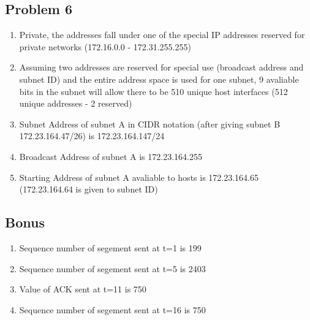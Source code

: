 \documentclass[14pt]{article}
\begin{document}
\pagebreak

\subsection*{Problem 6}
\begin{enumerate}
\item Private, the addresses fall under one of the special IP addresses reserved for private networks (172.16.0.0 - 172.31.255.255)
\item Assuming two addresses are reserved for special use (broadcast address and subnet ID) and the entire address space is used for one subnet, 9 avaliable bits in the subnet will allow there to be 510 unique host interfaces (512 unique addresses - 2 reserved)
\item Subnet Address of subnet A in CIDR notation (after giving subnet B 172.23.164.47/26) is 172.23.164.147/24
\item Broadcast Address of subnet A is 172.23.164.255
\item Starting Address of subnet A avaliable to hosts is 172.23.164.65 (172.23.164.64 is given to subnet ID)
\end{enumerate}

\subsection*{Bonus}
\begin{enumerate}
\item Sequence number of segement sent at t=1 is 199
\item Sequence number of segement sent at t=5 is 2403
\item Value of ACK sent at t=11 is 750
\item Sequence number of segement sent at t=16 is 750
\end{enumerate}
\end{document}
